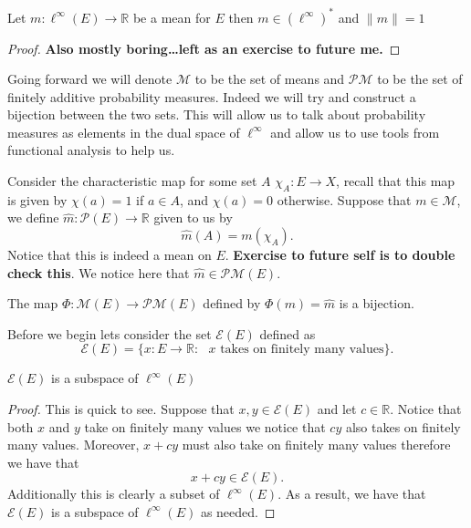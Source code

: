 \begin{propn}
  Let $m: \ell^{\infty}(E) \to \mathbb{R}$ be a mean for $E$ then $m \in
  (\ell^{\infty})^{*}$ and $\|m\| = 1$
\end{propn}
\begin{proof}
  \textbf{Also mostly boring\ldots left as an exercise to future me.}
\end{proof}

Going forward we will denote $\mathcal{M}$ to be the set of means and
$\mathcal{PM}$ to be the set of finitely additive probability measures. Indeed
we will try and construct a bijection between the two sets. This will allow us
to talk about probability measures as elements in the dual space of
$\ell^{\infty}$ and allow us to use tools from functional analysis to help us.

Consider the characteristic map for some set $A$ $\chi_A: E \to X$, recall that 
this map is given by $\chi(a) = 1$ if $a \in A$, and $\chi(a) = 0$ otherwise.
Suppose that $m \in \mathcal{M}$, we define $\widehat{m}: \mathcal{P}(E) \to
\mathbb{R}$ given to us by
\[
\widehat{m}(A) = m(\chi_A)
.\] 
Notice that this is indeed a mean on $E$. \textbf{Exercise to future self is to
double check this}. We notice here that $\widehat{m} \in
\mathcal{P}\mathcal{M}(E)$.

\begin{thm}
  The map $\Phi: \mathcal{M}(E) \to \mathcal{P}\mathcal{M}(E)$ defined by
  $\Phi(m) = \widehat{m}$ is a bijection.
\end{thm}

Before we begin lets consider the set $\mathcal{E}(E)$ defined as
\[
  \mathcal{E}(E) = \{x: E \to \mathbb{R}: \textrm{ $x$ takes on finitely many
  values}\} 
.\] 

\begin{lemma}
  $\mathcal{E}(E)$ is a subspace of $\ell^{\infty}(E)$
\end{lemma}
\begin{proof}
  This is quick to see. Suppose that $x, y \in \mathcal{E}(E)$ and let $c \in
  \mathbb{R}$. Notice that both $x$ and $y$ take on finitely many values
  we notice that $cy$ also takes on finitely many values. Moreover, $x + cy$
  must also take on finitely many values therefore we have that
  \[
  x + cy \in \mathcal{E}(E)
  .\] 
  Additionally this is clearly a subset of $\ell^{\infty}(E)$. As a result, we
  have that $\mathcal{E}(E)$ is a subspace of $\ell^{\infty}(E)$ as needed.
\end{proof}

